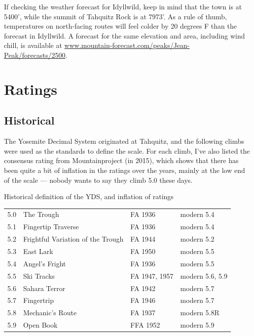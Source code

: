 \documentclass{tahquitz}
\begin{document}
If checking the weather forecast for Idyllwild, keep in mind that the town is at 5400',
while the summit of Tahquitz Rock is at 7973'. As a rule of thumb, temperatures on north-facing
routes will feel colder by 20 degrees F than the forecast in Idyllwild.
A forecast for the same elevation and area, including wind chill, is
available at \url{www.mountain-forecast.com/peaks/Jean-Peak/forecasts/2500}.

\section{Ratings}

\subsection{Historical}

The Yosemite Decimal System originated at Tahquitz, and the following
climbs were used as the standards to define the scale. For each climb, I've also listed the
consensus rating from Mountainproject (in 2015), which shows that there has been
quite a bit of inflation in the ratings over the years, mainly at the low end of the
scale --- nobody wants to say they climb 5.0 these days.

\begin{mytable}{Historical definition of the YDS, and inflation of ratings}
\begin{tabular}{llll}
5.0 & The Trough                        & FA 1936 & modern  5.4 \\
5.1 & Fingertip Traverse                & FA 1936 & modern  5.4 \\
5.2 & Frightful Variation of the Trough & FA 1944 & modern  5.2 \\
5.3 & East Lark                         & FA 1950 & modern  5.5 \\
5.4 & Angel's Fright                    & FA 1936 & modern  5.5 \\
5.5 & Ski Tracks                        & FA 1947, 1957 & modern  5.6, 5.9 \\
5.6 & Sahara Terror                     & FA 1942 & modern  5.7 \\
5.7 & Fingertrip                        & FA 1946 & modern  5.7 \\
5.8 & Mechanic's Route                  & FA 1937 & modern  5.8R \\
5.9 & Open Book                         & FFA 1952 & modern  5.9
\end{tabular}
\end{mytable}
\end{document}
